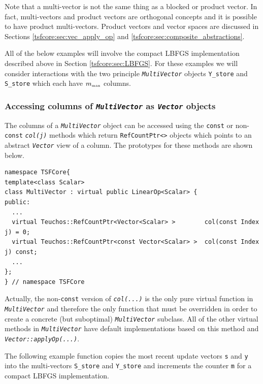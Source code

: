 Note that a multi-vector is not the same thing as a blocked or product
vector.  In fact, multi-vectors and product vectors are orthogonal
concepts and it is possible to have product multi-vectors.  Product
vectors and vector spaces are discussed in Sections
{}\ref{tsfcore:sec:vec_apply_op} and
{}\ref{tsfcore:sec:composite_abstractions}.

All of the below examples will involve the compact LBFGS
implementation described above in Section {}\ref{tsfcore:sec:LBFGS}.
For these examples we will consider interactions with the two
principle {}\texttt{\textit{Multi\-Vector}} objects
{}\texttt{Y\_store} and {}\texttt{S\_store} which each have
$m_{\tiny\mbox{max}}$ columns.

%
\subsubsection{Accessing columns of {}\texttt{\textit{Multi\-Vector}}
as {}\texttt{\textit{Vector}} objects}
%

The columns of a {}\texttt{\textit{Multi\-Vector}} object can be
accessed using the {}\texttt{const} or non-\texttt{const}
{}\texttt{\textit{col(j)}} methods which return
{}\texttt{RefCountPtr<>} objects which points to an abstract
{}\texttt{\textit{Vector}} view of a column.  The prototypes for these
methods are shown below.

{\scriptsize\begin{verbatim}
namespace TSFCore{
template<class Scalar>
class MultiVector : virtual public LinearOp<Scalar> {
public:
  ...
  virtual Teuchos::RefCountPtr<Vector<Scalar> >        col(const Index j) = 0;
  virtual Teuchos::RefCountPtr<const Vector<Scalar> >  col(const Index j) const;
  ...
};
} // namespace TSFCore
\end{verbatim}}

{}\noindent{}Actually, the non-\texttt{const} version of
{}\texttt{\textit{col(...)}}  is the only pure virtual function in
{}\texttt{\textit{Multi\-Vector}} and therefore the only function that
must be overridden in order to create a concrete (but suboptimal)
{}\texttt{\textit{Multi\-Vector}} subclass.  All of the other virtual
methods in {}\texttt{\textit{Multi\-Vector}} have default
implementations based on this method and
{}\texttt{\textit{Vector\-::applyOp(\-...)}}.

The following example function copies the most recent update vectors
{}\texttt{s} and {}\texttt{y} into the multi-vectors
{}\texttt{S\_store} and {}\texttt{Y\_store} and increments the counter
{}\texttt{m} for a compact LBFGS implementation.

